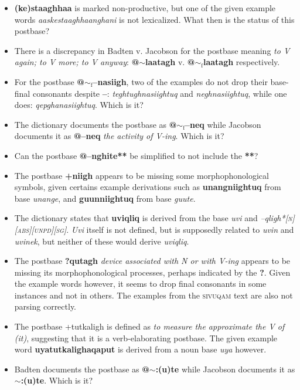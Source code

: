 \documentclass{article}
\begin{document}
\begin{itemize}
\item \textbf{(ke)staaghhaa} is marked non-productive, but one of the given example words \textit{aaskestaaghhaanghani} is not lexicalized. What then is the status of this postbase?

\item There is a discrepancy in Badten v. Jacobson for the postbase meaning \textit{to V again; to V more; to V anyway}: \textbf{@$\sim$laatagh} v. \textbf{@$\sim_\text{f}$laatagh} respectively.

\item For the postbase \textbf{@$\sim_\text{f}$--nasiigh}, two of the examples do not drop their base-final consonants despite \textbf{--}: \textit{teghtughnasiightuq} and \textit{neghnasiightuq}, while one does: \textit{qepghanasiightuq}. Which is it?

\item The dictionary documents the postbase as \textbf{@$\sim_\text{f}$--neq} while Jacobson documents it as \textbf{@--neq} \textit{the activity of V-ing}. Which is it?

\item Can the postbase \textbf{@--nghite**} be simplified to not include the \textbf{**}?

\item The postbase \textbf{+niigh} appears to be missing some morphophonological symbols, given certains example derivations such as \textbf{unangniightuq} from base \textit{unange}, and \textbf{guunniightuq} from base \textit{guute}.

\item The dictionary states that \textbf{uviqliq} is derived from the base \textit{uvi} and \textit{--qligh*\textsc{[n][abs][unpd][sg]}}. \textit{Uvi} itself is not defined, but is supposedly related to \textit{uvin} and \textit{uvinek}, but neither of these would derive \textit{uviqliq}.

\item The postbase \textbf{?qutagh} \textit{device associated with N or with V-ing} appears to be missing its morphophonological processes, perhaps indicated by the \textbf{?}. Given the example words however, it seems to drop final consonants in some instances and not in others. The examples from the \textsc{sivuqam} text are also not parsing correctly.

\item The postbase {+tutkaligh} is defined as \textit{to measure the approximate the V of (it)}, suggesting that it is a verb-elaborating postbase. The given example word \textbf{uyatutkalighaqaput} is derived from a noun base \textit{uya} however.

\item Badten documents the postbase as \textbf{@$\sim$:(u)te} while Jacobson documents it as \textbf{$\sim$:(u)te}. Which is it?
\end{itemize}
\end{document}
